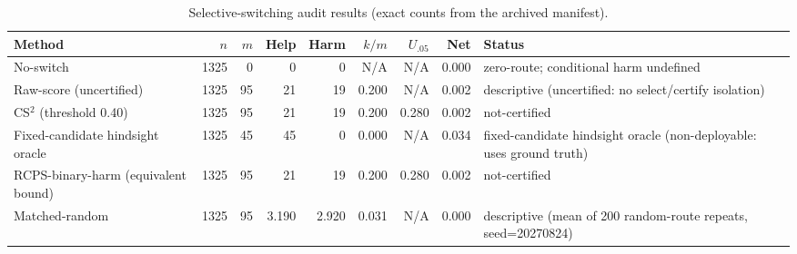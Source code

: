 \begin{table}[t]
\centering
\caption{Selective-switching audit results (exact counts from the archived manifest).}
\label{tab:cs2_main}
\begin{tabular}{lrrrrrrrl}
\toprule
Method & $n$ & $m$ & Help & Harm & $k/m$ & $U_{.05}$ & Net & Status \\
\midrule
No-switch & 1325 & 0 & 0 & 0 & N/A & N/A & 0.000 & zero-route; conditional harm undefined \\
Raw-score (uncertified) & 1325 & 95 & 21 & 19 & 0.200 & N/A & 0.002 & descriptive (uncertified: no select/certify isolation) \\
CS$^2$ (threshold 0.40) & 1325 & 95 & 21 & 19 & 0.200 & 0.280 & 0.002 & not-certified \\
Fixed-candidate hindsight oracle & 1325 & 45 & 45 & 0 & 0.000 & N/A & 0.034 & fixed-candidate hindsight oracle (non-deployable: uses ground truth) \\
RCPS-binary-harm (equivalent bound) & 1325 & 95 & 21 & 19 & 0.200 & 0.280 & 0.002 & not-certified \\
Matched-random & 1325 & 95 & 3.190 & 2.920 & 0.031 & N/A & 0.000 & descriptive (mean of 200 random-route repeats, seed=20270824) \\
\bottomrule
\end{tabular}
\end{table}
